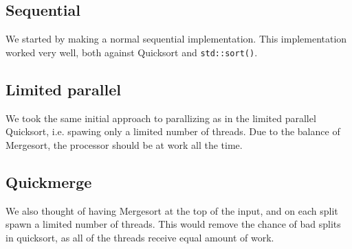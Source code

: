 \subsection{Sequential}
We started by making a normal sequential implementation. This implementation
worked very well, both against Quicksort and \texttt{std::sort()}.

\subsection{Limited parallel}
We took the same initial approach to parallizing as in the limited parallel
Quicksort, i.e. spawing only a limited number of threads. Due to the balance of
Mergesort, the processor should be at work all the time.

\subsection{Quickmerge}
We also thought of having Mergesort at the top of the input, and on each split
spawn a limited number of threads. This would remove the chance of bad splits
in quicksort, as all of the threads receive equal amount of work.


